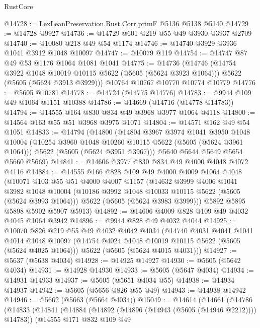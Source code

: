 \begin{lexlean}{RustCore}
\begin{coremodule}
@14728 := LexLeanPreservation.Rust.Corr.primF @5136 @5138 @5140
@14729 := @14728 @9927
@14736 := @14729 @601 @219 @55 @49 @3930 @3937 @2709
@14740 := @10080 @218 @49 @54 @1174
@14746 := @14740 @3929 @3936 @1041 @3912 @1048 @10097
@14747 := @10079 @119
@14754 := @14747 @87 @49 @53 @1176 @1064 @1081 @1041
@14775 := @14736
    (@14746
      (@14754 @3922 @1048 @10019 @10115 @5622 (@5605 (@5624 @3923 @1064)))
      @5622
      (@5605 (@5624 @3913 @3929)))
    @10764
    @10767
    @10770
    @10774
    @10779
@14776 := @5605 @10781
@14778 := @14724 (@14775 @14776)
@14783 := @9944 @109 @49 @1064 @1151 @10388
@14786 := @14669 (@14716 (@14778 @14783))
@14794 := @14555 @164 @830 @834 @49 @3968 @3977 @1064 @4118
@14800 := @14564 @163 @55 @51 @3968 @3975 @1071
@14804 := @14571 @162 @49 @54 @1051
@14833 := @14794
    (@14800
      (@14804
        @3967
        @3974
        @1041
        @3950
        @1048
        @10004
        (@10254 @3960 @1048 @10260 @10115 @5622 (@5605 (@5624 @3961 @1064)))
        @5622
        (@5605 (@5624 @3951 @3967)))
      @5640
      @5644
      @5649
      @5654
      @5660
      @5669)
@14841 := @14606 @3977 @830 @834 @49 @4000 @4048 @4072 @4116
@14884 := @14555
    @166
    @828
    @109
    @49
    @4000
    @4009
    @1064
    @4048
    (@10071
      @103
      @55
      @51
      @4000
      @4007
      @1157
      (@14632
        @3999
        @4006
        @1041
        @3982
        @1048
        @10004
        (@10186 @3992 @1048 @10033 @10115 @5622 (@5605 (@5624 @3993 @1064)))
        @5622
        (@5605 (@5624 @3983 @3999)))
      @5892
      @5895
      @5898
      @5902
      @5907
      @5913)
@14892 := @14606 @4009 @828 @109 @49 @4032 @4045 @1064 @3942
@14896 := @9944 @828 @49 @4032 @4044
@14925 := @10070
    @826
    @219
    @55
    @49
    @4032
    @4042
    @4034
    (@14740
      @4031
      @4041
      @1041
      @4014
      @1048
      @10097
      (@14754 @4024 @1048 @10019 @10115 @5622 (@5605 (@5624 @4025 @1064)))
      @5622
      (@5605 (@5624 @4015 @4031)))
@14927 := @5637 (@5638 @4034)
@14928 := @14925 @14927
@14930 := @5605 (@5642 @4034)
@14931 := @14928 @14930
@14933 := @5605 (@5647 @4034)
@14934 := @14931 @14933
@14937 := @5605 (@5651 @4034 @55)
@14938 := @14934 @14937
@14942 := @5605 (@5656 @826 @55 @49)
@14943 := @14938 @14942
@14946 := @5662 (@5663 (@5664 @4034))
@15049 := @14614
    (@14661
      (@14786
        (@14833
          (@14841
            (@14884 (@14892 (@14896 (@14943 (@5605 (@14946 @2212)))) @14783))
            (@14555
              @171
              @832
              @109
              @49

\end{coremodule}
\end{lexlean}

